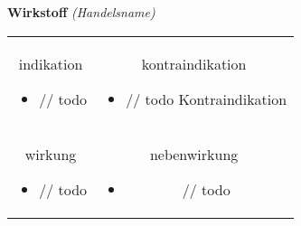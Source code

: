 \begin{frame}{
    \textbf{Wirkstoff}
    \textit{(Handelsname)}
}
    \begin{tabular}{c c}
        \begin{beamercolorbox}[wd=\boxwidth\textwidth,ht=\boxheight\textheight,sep=1em]{indikation}
            \begin{itemize}
                \item // todo
            \end{itemize}
        \end{beamercolorbox} & 
        \begin{beamercolorbox}[wd=\boxwidth\textwidth,ht=\boxheight\textheight,sep=1em]{kontraindikation}
            \begin{itemize}
                \item // todo Kontraindikation 
            \end{itemize}
        \end{beamercolorbox} \\
        \begin{beamercolorbox}[wd=\boxwidth\textwidth,ht=\boxheight\textheight,sep=1em]{wirkung}
            \begin{itemize}
                \item // todo
            \end{itemize}
        \end{beamercolorbox} & 
        \begin{beamercolorbox}[wd=\boxwidth\textwidth,ht=\boxheight\textheight,sep=1em]{nebenwirkung}
            \begin{itemize}
                \item // todo
            \end{itemize}
        \end{beamercolorbox} \\
    \end{tabular}
\end{frame}

